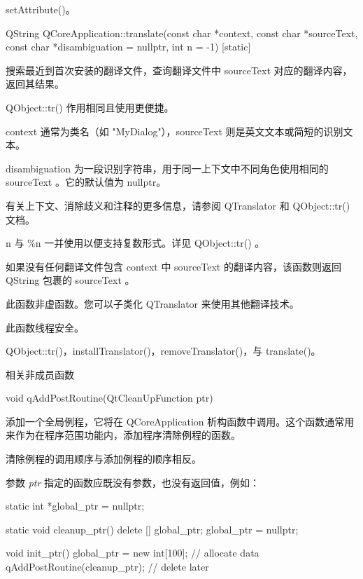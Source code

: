 \begin{seeAlso}
setAttribute()。
\end{seeAlso}

QString QCoreApplication::translate(const char *context, const char *sourceText, const char *disambiguation = nullptr, int n = -1) [static]

搜索最近到首次安装的翻译文件，查询翻译文件中 sourceText 对应的翻译内容，返回其结果。

QObject::tr() 作用相同且使用更便捷。

context 通常为类名（如 "MyDialog"），sourceText 则是英文文本或简短的识别文本。

disambiguation 为一段识别字符串，用于同一上下文中不同角色使用相同的 sourceText 。它的默认值为 nullptr。

有关上下文、消除歧义和注释的更多信息，请参阅 QTranslator 和 QObject::tr() 文档。

n 与 \%n 一并使用以便支持复数形式。详见 QObject::tr() 。

如果没有任何翻译文件包含 context 中 sourceText 的翻译内容，该函数则返回 QString 包裹的 sourceText 。

此函数非虚函数。您可以子类化 QTranslator 来使用其他翻译技术。


\begin{notice}
此函数线程安全。
\end{notice}


\begin{seeAlso}
QObject::tr()，installTranslator()，removeTranslator()，与 translate()。
\end{seeAlso}

\splitLine

相关非成员函数

void qAddPostRoutine(QtCleanUpFunction ptr)

添加一个全局例程，它将在 QCoreApplication 析构函数中调用。这个函数通常用来作为在程序范围功能内，添加程序清除例程的函数。

清除例程的调用顺序与添加例程的顺序相反。

参数 \emph{ptr} 指定的函数应既没有参数，也没有返回值，例如：


\begin{cppcode}
static int *global_ptr = nullptr;

static void cleanup_ptr()
{
    delete [] global_ptr;
    global_ptr = nullptr;
}

void init_ptr()
{
    global_ptr = new int[100];      // allocate data
    qAddPostRoutine(cleanup_ptr);   // delete later
}
\end{cppcode}



